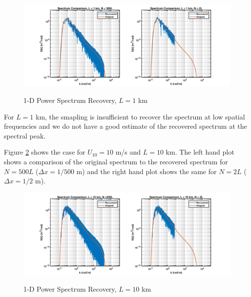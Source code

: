 \begin{figure}[H]
  \begin{center}
\includegraphics[width=6in]{../media/Ocean_Surface/sea_surface_spectra_1000.png}
  \end{center}
  \renewcommand{\baselinestretch}{1} \small\normalsize
  \begin{quote}
    \caption[1-D Power Spectrum Recovery, $L = 1$ km]{1-D Power Spectrum Recovery, $L = 1$ km\label{os_fig:7bbb}}
  \end{quote}
\end{figure}
\renewcommand{\baselinestretch}{2} \small\normalsize

For $L = 1$ km, the smapling is insufficient to recover the spectrum at low spatial frequencies and we do not have a good estimate of the recovered spectrum at the spectral peak.

Figure \ref{os_fig:7aaa} shows the case for $U_{10} = 10$ m/s and $L = 10$ km. The left hand plot shows a comparison of the original spectrum to the recovered spectrum for $N = 500L$ ($\Delta x = 1/500$ m) and the right hand plot shows the same for $N=2L$ ($\Delta x = 1/2$ m).

\begin{figure}[H]
  \begin{center}
\includegraphics[width=6in]{../media/Ocean_Surface/sea_surface_spectra_10000.png}
  \end{center}
  \renewcommand{\baselinestretch}{1} \small\normalsize
  \begin{quote}
    \caption[1-D Power Spectrum Recovery, $L = 10$ km]{1-D Power Spectrum Recovery, $L = 10$ km\label{os_fig:7aaa}}
  \end{quote}
\end{figure}
\renewcommand{\baselinestretch}{2} \small\normalsize

